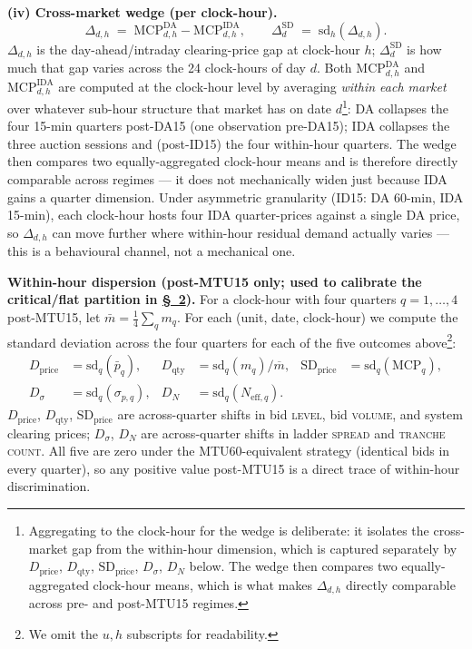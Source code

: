 \documentclass[11pt]{article}
\begin{document}
\textbf{(iv) Cross-market wedge (per clock-hour).}
\[
\Delta_{d,h} \;=\; \text{MCP}^{\text{DA}}_{d,h} - \text{MCP}^{\text{IDA}}_{d,h}, \qquad
\Delta^{\text{SD}}_d \;=\; \mathrm{sd}_h(\Delta_{d,h}).
\]
$\Delta_{d,h}$ is the day-ahead/intraday clearing-price gap at clock-hour $h$; $\Delta^{\text{SD}}_d$ is how much that gap varies across the 24 clock-hours of day $d$. Both $\text{MCP}^{\text{DA}}_{d,h}$ and $\text{MCP}^{\text{IDA}}_{d,h}$ are computed at the clock-hour level by averaging \emph{within each market} over whatever sub-hour structure that market has on date $d$\footnote{Aggregating to the clock-hour for the wedge is deliberate: it isolates the cross-market gap from the within-hour dimension, which is captured separately by $D_{\text{price}}$, $D_{\text{qty}}$, $\text{SD}_{\text{price}}$, $D_\sigma$, $D_N$ below. The wedge then compares two equally-aggregated clock-hour means, which is what makes $\Delta_{d,h}$ directly comparable across pre- and post-MTU15 regimes.}: DA collapses the four 15-min quarters post-DA15 (one observation pre-DA15); IDA collapses the three auction sessions and (post-ID15) the four within-hour quarters. The wedge then compares two equally-aggregated clock-hour means and is therefore directly comparable across regimes --- it does not mechanically widen just because IDA gains a quarter dimension. Under asymmetric granularity (ID15: DA 60-min, IDA 15-min), each clock-hour hosts four IDA quarter-prices against a single DA price, so $\Delta_{d,h}$ can move further where within-hour residual demand actually varies --- this is a behavioural channel, not a mechanical one.
\vspace{6pt}

\textbf{Within-hour dispersion (post-MTU15 only; used to calibrate the critical/flat partition in \hyperref[sec:partition]{\S~2}).} For a clock-hour with four quarters $q=1,\dots,4$ post-MTU15, let $\bar{m}=\tfrac{1}{4}\sum_q m_q$. For each (unit, date, clock-hour) we compute the standard deviation across the four quarters for each of the five outcomes above\footnote{We omit the $u,h$ subscripts for readability.}:
\[
\begin{aligned}
D_{\text{price}} &= \mathrm{sd}_q(\bar p_q), &
D_{\text{qty}}   &= \mathrm{sd}_q(m_q)/\overline{m}, &
\text{SD}_{\text{price}} &= \mathrm{sd}_q(\text{MCP}_q), \\
D_\sigma &= \mathrm{sd}_q(\sigma_{p,q}), &
D_N      &= \mathrm{sd}_q(N_{\text{eff},q}).
\end{aligned}
\]
$D_{\text{price}}$, $D_{\text{qty}}$, $\text{SD}_{\text{price}}$ are across-quarter shifts in bid \textsc{level}, bid \textsc{volume}, and system clearing prices; $D_\sigma$, $D_N$ are across-quarter shifts in ladder \textsc{spread} and \textsc{tranche count}. All five are zero under the MTU60-equivalent strategy (identical bids in every quarter), so any positive value post-MTU15 is a direct trace of within-hour discrimination.
\end{document}

